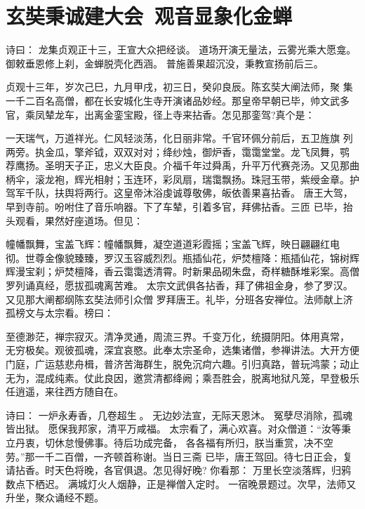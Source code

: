 \chapter{玄奘秉诚建大会~观音显象化金蝉}

诗曰：
龙集贞观正十三，王宣大众把经谈。
道场开演无量法，云雾光乘大愿龛。
御敕垂恩修上刹，金蝉脱壳化西涵。
普施善果超沉没，秉教宣扬前后三。

贞观十三年，岁次己巳，九月甲戌，初三日，癸卯良辰。陈玄奘大阐法师，聚
集一千二百名高僧，都在长安城化生寺开演诸品妙经。那皇帝早朝已毕，帅文武多
官，乘凤辇龙车，出离金銮宝殿，径上寺来拈香。怎见那銮驾?真个是：

一天瑞气，万道祥光。仁风轻淡荡，化日丽非常。千官环佩分前后，五卫旌旗
列两旁。执金瓜，擎斧钺，双双对对；绛纱烛，御炉香，霭霭堂堂。龙飞凤舞，鹗
荐鹰扬。圣明天子正，忠义大臣良。介福千年过舜禹，升平万代赛尧汤。又见那曲
柄伞，滚龙袍，辉光相射；玉连环，彩凤扇，瑞霭飘扬。珠冠玉带，紫绶金章。护
驾军千队，扶舆将两行。这皇帝沐浴虔诚尊敬佛，皈依善果喜拈香。
唐王大驾，早到寺前。吩咐住了音乐响器。下了车辇，引着多官，拜佛拈香。三匝
已毕，抬头观看，果然好座道场。但见：

幢幡飘舞，宝盖飞辉：幢幡飘舞，凝空道道彩霞摇；宝盖飞辉，映日翩翩红电
彻。世尊金像貌臻臻，罗汉玉容威烈烈。瓶插仙花，炉焚檀降：瓶插仙花，锦树辉
辉漫宝刹；炉焚檀降，香云霭霭透清霄。时新果品砌朱盘，奇样糖酥堆彩案。高僧
罗列诵真经，愿拔孤魂离苦难。
太宗文武俱各拈香，拜了佛祖金身，参了罗汉。又见那大阐都纲陈玄奘法师引众僧
罗拜唐王。礼毕，分班各安禅位。法师献上济孤榜文与太宗看。榜曰：

至德渺茫，禅宗寂灭。清净灵通，周流三界。千变万化，统摄阴阳。体用真常，
无穷极矣。观彼孤魂，深宜哀愍。此奉太宗圣命，选集诸僧，参禅讲法。大开方便
门庭，广运慈悲舟楫，普济苦海群生，脱免沉疴六趣。引归真路，普玩鸿蒙；动止
无为，混成纯素。仗此良因，邀赏清都绛阙；乘吾胜会，脱离地狱凡笼，早登极乐
任逍遥，来往西方随自在。

诗曰：
一炉永寿香，几卷超生。
无边妙法宣，无际天恩沐。
冤孽尽消除，孤魂皆出狱。
愿保我邦家，清平万咸福。
太宗看了，满心欢喜。对众僧道：“汝等秉立丹衷，切休怠慢佛事。待后功成完备，
各各福有所归，朕当重赏，决不空劳。”那一千二百僧，一齐顿首称谢。当日三斋
已毕，唐王驾回。待七日正会，复请拈香。时天色将晚，各官俱退。怎见得好晚?
你看那：
万里长空淡落辉，归鸦数点下栖迟。
满城灯火人烟静，正是禅僧入定时。
一宿晚景题过。次早，法师又升坐，聚众诵经不题。

